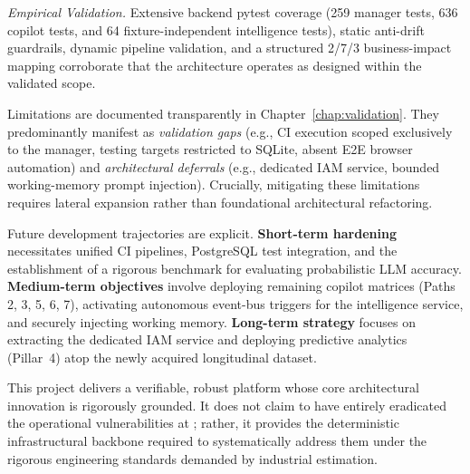 \textit{Empirical Validation.} Extensive backend pytest coverage (259 manager tests, 636 copilot tests, and 64 fixture-independent intelligence tests), static anti-drift guardrails, dynamic pipeline validation, and a structured 2/7/3 business-impact mapping corroborate that the architecture operates as designed within the validated scope.

Limitations are documented transparently in Chapter~\ref{chap:validation}. They predominantly manifest as \textit{validation gaps} (e.g., CI execution scoped exclusively to the manager, testing targets restricted to SQLite, absent E2E browser automation) and \textit{architectural deferrals} (e.g., dedicated IAM service, bounded working-memory prompt injection). Crucially, mitigating these limitations requires lateral expansion rather than foundational architectural refactoring.

Future development trajectories are explicit. \textbf{Short-term hardening} necessitates unified CI pipelines, PostgreSQL test integration, and the establishment of a rigorous benchmark for evaluating probabilistic LLM accuracy. \textbf{Medium-term objectives} involve deploying remaining copilot matrices (Paths 2, 3, 5, 6, 7), activating autonomous event-bus triggers for the intelligence service, and securely injecting working memory. \textbf{Long-term strategy} focuses on extracting the dedicated IAM service and deploying predictive analytics (Pillar~4) atop the newly acquired longitudinal dataset.

This project delivers a verifiable, robust platform whose core architectural innovation is rigorously grounded. It does not claim to have entirely eradicated the operational vulnerabilities at \clientCompany; rather, it provides the deterministic infrastructural backbone required to systematically address them under the rigorous engineering standards demanded by industrial estimation.
